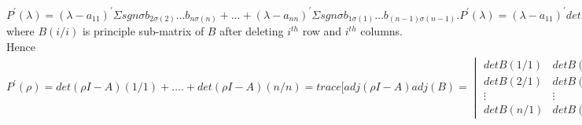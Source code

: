 $P^{\prime}(\lambda )   =  (\lambda -a_{11})^{\prime} \Sigma sgn \sigma b_{2\sigma (2)} \ldots b_{n\sigma (n)} + \ldots + 
                     (\lambda -a_{nn})^{\prime} \Sigma sgn \sigma b_{1\sigma (1)} \ldots b_{(n-1)\sigma (n-1)}.
 P^{'}(\lambda )   =  (\lambda -a_{11})^{'} det B(1/1) +\ldots+ (\lambda -a_{nn})^{'} det B(n/n)$
 where $B(i/i)$ is principle  sub-matrix of $B$ after deleting $i^{th}$ row and $i^{th}$ columns.
 Hence $P^{'}(\rho )= det(\rho I - A)(1/1) +\ldots.+ det(\rho I - A)(n/n)= trace[adj(\rho I - A) adj(B) = 
\begin{vmatrix} 
  detB(1/1) & detB(1/2) & \ldots & detB(1/n)\\
  detB(2/1) & detB(2/2) & \ldots &detB(2/n)\\
  \vdots& \vdots&\ddots&\ \vdots\\
  detB(n/1) & detB(n/2) & \ldots &detB(n/1)
\end{vmatrix}^{T} 
adj(B) =$
% 
% 
% 
% 

